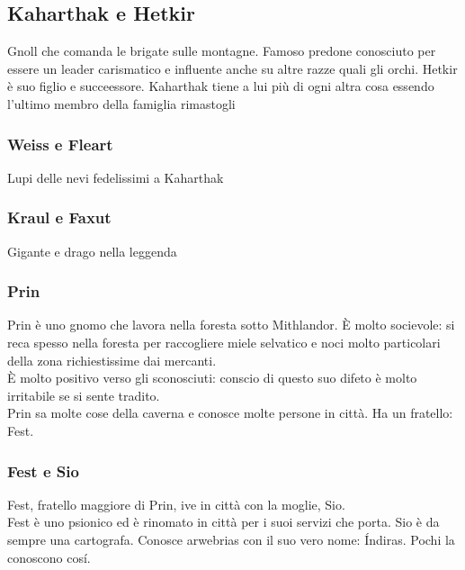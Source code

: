 \subsection{Kaharthak e Hetkir}\label{char:kaharthak}
Gnoll che comanda le brigate sulle montagne. Famoso predone conosciuto per essere
un leader carismatico e influente anche su altre razze quali gli orchi.
Hetkir \`e suo figlio e succeessore. Kaharthak tiene a lui pi\`u di ogni altra cosa
essendo l'ultimo membro della famiglia rimastogli
\subsubsection{Weiss e Fleart}\label{char:weiss}
Lupi delle nevi fedelissimi a Kaharthak
\subsubsection{Kraul e Faxut}\label{char:kraul}
Gigante e drago nella leggenda
\subsubsection{Prin}\label{char:prin}
Prin \`e uno gnomo che lavora nella foresta sotto Mithlandor. \`E molto socievole: si
reca spesso nella foresta per raccogliere miele selvatico e noci molto particolari
della zona richiestissime dai mercanti.\\
\`E molto positivo verso gli sconosciuti: conscio di questo suo difeto \`e molto irritabile
se si sente tradito.\\
Prin sa molte cose della caverna e conosce molte persone in citt\`a. Ha un fratello: Fest.
\subsubsection{Fest e Sio}
Fest, fratello maggiore di Prin, ive in citt\`a con la moglie, Sio.\\
Fest \`e uno psionico ed \`e rinomato in citt\`a per i suoi servizi che porta.
Sio \`e da sempre una cartografa. Conosce arwebrias con il suo vero nome: \'Indiras.
Pochi la conoscono cos\'i.
